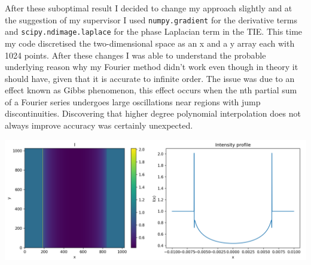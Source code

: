 \documentclass[9pt, a4paper]{article}
\newenvironment{Figure}
    {\par\medskip\noindent\minipage{\linewidth}}
    {\endminipage\par\medskip}
\begin{document}
After these suboptimal result I decided to change my approach slightly and at the suggestion of my supervisor I used \texttt{numpy.gradient} for the derivative terms and \texttt{scipy.ndimage.laplace} for the phase Laplacian term in the TIE. This time my code discretised the two-dimensional space as an x and a y array each with 1024 points. 
After these changes I was able to understand the probable underlying reason why my Fourier method didn't work even though in theory it should have, given that it is accurate to infinite order\cite{Chris}\cite{Fornberg}. The issue was due to an effect known as Gibbs phenomenon, this effect occurs when the nth partial sum of a Fourier series undergoes large oscillations near regions with jump discontinuities\cite{Gibbs}. Discovering that higher degree polynomial interpolation does not always improve accuracy was certainly unexpected.
\begin{Figure}
\centering
\includegraphics[width=\linewidth]{FD_intensity_profile.pdf}
\end{Figure}
\end{document}
